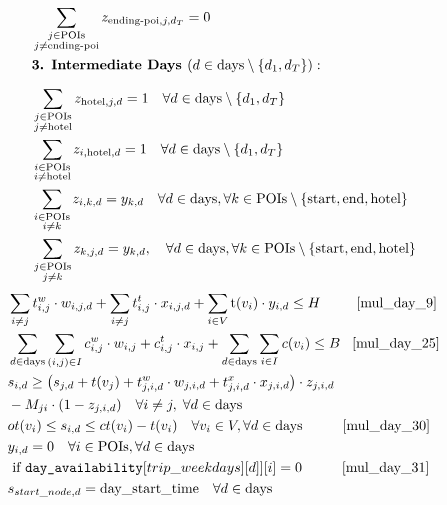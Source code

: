 {\begin{align}
    & \sum_{\substack{j \in \text{POIs} \\ j \neq \text{ending-poi}}} z_{\text{ending-poi},j,d_T} = 0 \\
    & \textbf{3. Intermediate Days } (d \in \text{days} \setminus \{d_1, d_T\}): \notag \\[0.2cm]
    & \sum_{\substack{j \in \text{POIs} \\ j \neq \text{hotel}}} z_{\text{hotel},j,d} = 1 \quad \forall d \in \text{days} \setminus \{d_1, d_T\} \\
    & \sum_{\substack{i \in \text{POIs} \\ i \neq \text{hotel}}} z_{i,\text{hotel},d} = 1 \quad \forall d \in \text{days} \setminus \{d_1, d_T\} \\
    & \sum_{\substack{i \in \text{POIs} \\ i \neq k}} z_{i,k,d} = y_{k,d}
    \quad \forall d \in \text{days},\forall k \in \text{POIs} \setminus \{\text{start}, \text{end}, \text{hotel}\}\\
    & \sum_{\substack{j \in \text{POIs} \\ j \neq k}} z_{k,j,d} = y_{k,d}, \quad \forall d \in \text{days}, \forall k \in \text{POIs} \setminus \{\text{start}, \text{end}, \text{hotel}\}
\end{align}
\begin{align}
    & \sum_{i \ne j} t^{w}_{i,j} \cdot w_{i,j,d} + \sum_{i \ne j} t^{t}_{i,j} \cdot x_{i,j,d} + \sum_{i \in V} \text{t}(v_i) \cdot y_{i,d} \nonumber \leq H \hspace{0.9cm} \ref{mul_day_9}\\
    & \sum_{d \in \text{days}} \sum_{(i,j) \in I} c^{w}_{i,j} \cdot w_{i,j} + c^{t}_{i,j} \cdot x_{i,j} + \sum_{d \in \text{days}} \sum_{i \in I} c(v_i) \leq B \hspace{0.3cm} \ref{mul_day_25} \notag\\
    & s_{i,d} \geq \left( s_{j,d} + t(v_j) + t^{w}_{j,i,d} \cdot w_{j,i,d} + t^{x}_{j,i,d} \cdot x_{j,i,d} \right) \cdot z_{j,i,d} \notag\\
    &- M_{ji} \cdot (1 - z_{j,i,d}) \quad\forall i \neq j,\; \forall d \in \text{days} \\
    & ot(v_i) \leq s_{i,d} \leq ct(v_i) - t(v_i) \quad \forall v_i \in V, \forall d \in \text{days} \hspace{1cm}\ref{mul_day_30} \notag\\
    & y_{i,d} = 0 \quad \forall i \in \text{POIs}, \forall d \in \text{days} \notag \\& \text{ if } \texttt{day\_availability}[trip\_weekdays][d]][i] = 0 \hspace{1cm}\ref{mul_day_31} \notag\\
    & s_{start\_node,d} = \text{day\_start\_time} \quad \forall d \in \text{days}
\end{align}

}
